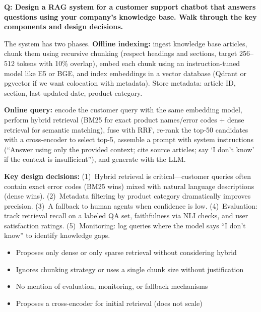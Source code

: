 \begin{interviewq}
\textbf{Q: Design a RAG system for a customer support chatbot that answers
questions using your company's knowledge base. Walk through the key components
and design decisions.}

 \quad {} \quad \badgefreq{\freqhigh}

\stronganswer
The system has two phases.  \textbf{Offline indexing:} ingest knowledge base
articles, chunk them using recursive chunking (respect headings and sections,
target 256--512 tokens with 10\% overlap), embed each chunk using an
instruction-tuned model like E5 or BGE, and index embeddings in a vector
database (Qdrant or pgvector if we want colocation with metadata).  Store
metadata: article ID, section, last-updated date, product category.

\textbf{Online query:} encode the customer query with the same embedding model,
perform hybrid retrieval (BM25 for exact product names/error codes + dense
retrieval for semantic matching), fuse with RRF, re-rank the top-50 candidates
with a cross-encoder to select top-5, assemble a prompt with system instructions
(``Answer using only the provided context; cite source articles; say `I don't
know' if the context is insufficient''), and generate with the LLM.

\textbf{Key design decisions:} (1)~Hybrid retrieval is critical---customer
queries often contain exact error codes (BM25 wins) mixed with natural language
descriptions (dense wins).  (2)~Metadata filtering by product category
dramatically improves precision.  (3)~A fallback to human agents when
confidence is low.  (4)~Evaluation: track retrieval recall on a labeled QA set,
faithfulness via NLI checks, and user satisfaction ratings.  (5)~Monitoring:
log queries where the model says ``I don't know'' to identify knowledge gaps.

\redflags
\begin{itemize}
    \item Proposes only dense or only sparse retrieval without considering hybrid
    \item Ignores chunking strategy or uses a single chunk size without justification
    \item No mention of evaluation, monitoring, or fallback mechanisms
    \item Proposes a cross-encoder for initial retrieval (does not scale)
\end{itemize}


\end{interviewq}
